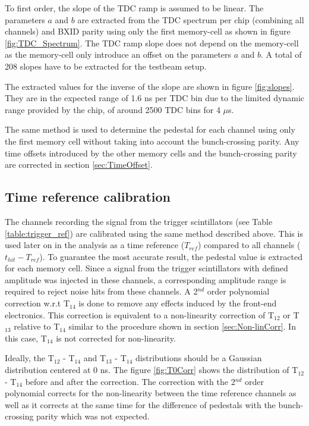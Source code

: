 \documentclass{JINST}
\begin{document}
To first order, the slope of the TDC ramp is assumed to be linear. The parameters $a$ and $b$ are extracted from the TDC spectrum per chip (combining all channels) and BXID parity using only the first memory-cell as shown in figure \ref{fig:TDC_Spectrum}. The TDC ramp slope does not depend on the memory-cell as the memory-cell only introduce an offset on the parameters $a$ and $b$. A total of 208 slopes have to be extracted for the testbeam setup.

The extracted values for the inverse of the slope are shown in figure \ref{fig:slopes}. They are in the expected range of 1.6 ns per TDC bin due to the limited dynamic range provided by the chip, of around 2500 TDC bins for 4 $\mu$s.

The same method is used to determine the pedestal for each channel using only the first memory cell without taking into account the bunch-crossing parity. Any time offsets introduced by the other memory cells and the bunch-crossing parity are corrected in section \ref{sec:TimeOffset}.

\subsection{Time reference calibration}

The channels recording the signal from the trigger scintillators (see Table \ref{table:trigger_ref}) are calibrated using the same method described above. This is used later on in the analysis as a time reference ($T_{ref}$) compared to all channels ($t_{hit} - T_{ref}$). To guarantee the most accurate result, the pedestal value is extracted for each memory cell. Since a signal from the trigger scintillators with defined amplitude was injected in these channels, a corresponding amplitude range is required to reject noise hits from these channels. A 2$^{nd}$ order polynomial correction w.r.t T$_{14}$ is done to remove any effects induced by the front-end electronics. This correction is equivalent to a non-linearity correction of T$_{12}$ or T$_{13}$ relative to T$_{14}$ similar to the procedure shown in section \ref{sec:Non-linCorr}. In this case, T$_{14}$ is not corrected for non-linearity.

Ideally, the T$_{12}$ - T$_{14}$ and T$_{13}$ - T$_{14}$ distributions should be a Gaussian distribution centered at 0 ns. The figure \ref{fig:T0Corr} shows the distribution of T$_{12}$ - T$_{14}$ before and after the correction. The correction with the 2$^{nd}$ order polynomial corrects for the non-linearity between the time reference channels as well as it corrects at the same time for the difference of pedestals with the bunch-crossing parity which was not expected.
\end{document}

